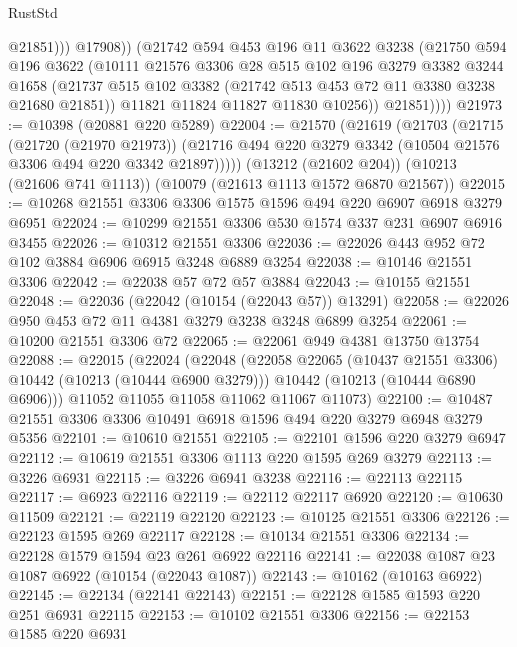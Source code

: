 \begin{lexlean}{RustStd}
\begin{coremodule}
{\begin{coremodule}
{{{{{{{{{{{{{{{{{{{{{{{{{{                    @21851)))
              @17908))
          (@21742
            @594
            @453
            @196
            @11
            @3622
            @3238
            (@21750
              @594
              @196
              @3622
              (@10111
                @21576
                @3306
                @28
                @515
                @102
                @196
                @3279
                @3382
                @3244
                @1658
                (@21737 @515 @102 @3382 (@21742 @513 @453 @72 @11 @3380 @3238 @21680 @21851))
                @11821
                @11824
                @11827
                @11830
                @10256))
            @21851))))
@21973 := @10398 (@20881 @220 @5289)
@22004 := @21570
    (@21619
      (@21703
        (@21715
          (@21720 (@21970 @21973))
          (@21716 @494 @220 @3279 @3342 (@10504 @21576 @3306 @494 @220 @3342 @21897)))))
    (@13212 (@21602 @204))
    (@10213 (@21606 @741 @1113))
    (@10079 (@21613 @1113 @1572 @6870 @21567))
@22015 := @10268 @21551 @3306 @3306 @1575 @1596 @494 @220 @6907 @6918 @3279 @6951
@22024 := @10299 @21551 @3306 @530 @1574 @337 @231 @6907 @6916 @3455
@22026 := @10312 @21551 @3306
@22036 := @22026 @443 @952 @72 @102 @3884 @6906 @6915 @3248 @6889 @3254
@22038 := @10146 @21551 @3306
@22042 := @22038 @57 @72 @57 @3884
@22043 := @10155 @21551
@22048 := @22036 (@22042 (@10154 (@22043 @57)) @13291)
@22058 := @22026 @950 @453 @72 @11 @4381 @3279 @3238 @3248 @6899 @3254
@22061 := @10200 @21551 @3306 @72
@22065 := @22061 @949 @4381 @13750 @13754
@22088 := @22015
    (@22024
      (@22048
        (@22058 @22065 (@10437 @21551 @3306) @10442 (@10213 (@10444 @6900 @3279)))
        @10442
        (@10213 (@10444 @6890 @6906)))
      @11052
      @11055
      @11058
      @11062
      @11067
      @11073)
@22100 := @10487 @21551 @3306 @3306 @10491 @6918 @1596 @494 @220 @3279 @6948 @3279 @5356
@22101 := @10610 @21551
@22105 := @22101 @1596 @220 @3279 @6947
@22112 := @10619 @21551 @3306 @1113 @220 @1595 @269 @3279
@22113 := @3226 @6931
@22115 := @3226 @6941 @3238
@22116 := @22113 @22115
@22117 := @6923 @22116
@22119 := @22112 @22117 @6920
@22120 := @10630 @11509
@22121 := @22119 @22120
@22123 := @10125 @21551 @3306
@22126 := @22123 @1595 @269 @22117
@22128 := @10134 @21551 @3306
@22134 := @22128 @1579 @1594 @23 @261 @6922 @22116
@22141 := @22038 @1087 @23 @1087 @6922 (@10154 (@22043 @1087))
@22143 := @10162 (@10163 @6922)
@22145 := @22134 (@22141 @22143)
@22151 := @22128 @1585 @1593 @220 @251 @6931 @22115
@22153 := @10102 @21551 @3306
@22156 := @22153 @1585 @220 @6931
}}}}}}}}}}}}}}}}}}}}}}}}}}
\end{coremodule}}
\end{coremodule}
\end{lexlean}
